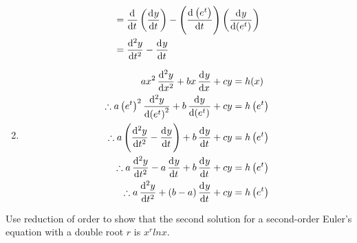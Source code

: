 \documentclass[fleqn, a4paper, 11pt, oneside]{amsart}
\theoremstyle{definition}
\theoremstyle{theorem}
\begin{document}
\begin{solution}
\begin{enumerate}
\begin{align*}
                                                  & = \dod{}{t}\left( \dod{y}{t} \right) - \left( \dod{\left( e^t \right)}{t} \right) \left( \dod{y}{\left( e^t \right)} \right)                                                                            \\
                                                  & = \dod[2]{y}{t} - \dod{y}{t}
			\end{align*}
		\item
			\begin{align*}
				a x^2 \dod[2]{y}{x} + b x \dod{y}{x} + c y                                                             & = h(x)                \\
				\therefore a \left( e^t \right)^2 \dod[2]{y}{\left( e^t \right)} + b \dod{y}{\left( e^t \right)} + c y & = h\left( e^t \right) \\
				\therefore a \left( \dod[2]{y}{t} - \dod{y}{t} \right) + b \dod{y}{t} + c y                            & = h\left( e^t \right) \\
				\therefore a \dod[2]{y}{t} - a \dod{y}{t} + b \dod{y}{t} + c y                                         & = h\left( e^t \right) \\
				\therefore a \dod[2]{y}{t} + (b - a) \dod{y}{t} + c y                                                  & = h\left( e^t \right)
			\end{align*}
	\end{enumerate}
\end{solution}

\begin{question}
	Use reduction of order to show that the second solution for a second-order Euler's equation with a double root $r$ is $x^r ln x$.
\end{question}
\end{document}
